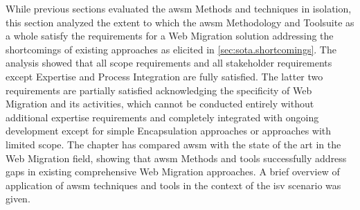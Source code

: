 While previous sections evaluated the \gls{awsm} Methods and techniques in isolation, this section analyzed the extent to which the \gls{awsm} Methodology and Toolsuite as a whole satisfy the requirements for a \gls{Web Migration} solution addressing the shortcomings of existing approaches as elicited in \cref{sec:sota.shortcomings}.
The analysis showed that all scope requirements and all stakeholder requirements except Expertise and Process Integration are fully satisfied.
The latter two requirements are partially satisfied acknowledging the specificity of \gls{Web Migration} and its activities, which cannot be conducted entirely without additional expertise requirements and completely integrated with ongoing development except for simple \gls{Encapsulation} approaches or approaches with limited scope.
The chapter has compared \gls{awsm} with the state of the art in the \gls{Web Migration} field, showing that \gls{awsm} Methods and tools successfully address gaps in existing comprehensive \gls{Web Migration} approaches.
A brief overview of application of \gls{awsm} techniques and tools in the context of the \gls{isv} scenario was given.

